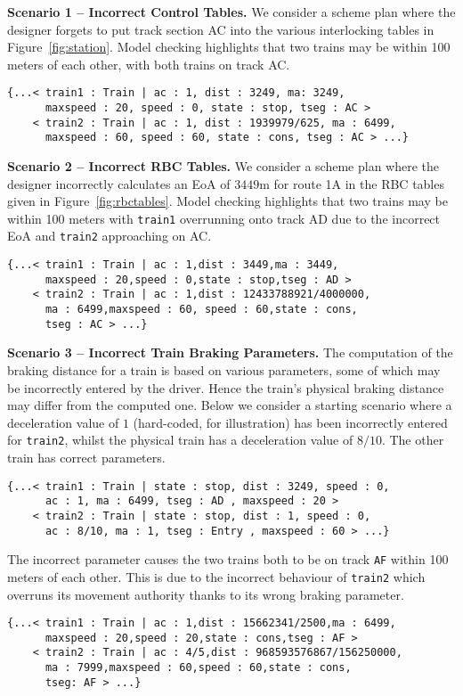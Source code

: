 \vspace{1ex}
\noindent
{\bf Scenario 1 -- Incorrect Control Tables.} We
consider a scheme plan where the designer forgets to put track section
AC into the various interlocking tables in
Figure~\ref{fig:station}. Model checking highlights that two trains
may be within 100 meters of each other, with both trains on track AC.

\begin{lstlisting}
{...< train1 : Train | ac : 1, dist : 3249, ma: 3249,
      maxspeed : 20, speed : 0, state : stop, tseg : AC >
    < train2 : Train | ac : 1, dist : 1939979/625, ma : 6499,
      maxspeed : 60, speed : 60, state : cons, tseg : AC > ...}
\end{lstlisting}

\vspace{1ex}
\noindent
{\bf Scenario 2 -- Incorrect RBC Tables.} We
consider a scheme plan where the designer incorrectly calculates an EoA
of $3449$m for route 1A in the RBC tables given in
Figure~\ref{fig:rbctables}. Model checking highlights that two trains
may be within 100 meters with \verb|train1| overrunning onto track AD due
to the incorrect EoA and \verb|train2| approaching on AC.

\begin{lstlisting}
{...< train1 : Train | ac : 1,dist : 3449,ma : 3449,
      maxspeed : 20,speed : 0,state : stop,tseg : AD >
    < train2 : Train | ac : 1,dist : 12433788921/4000000,
      ma : 6499,maxspeed : 60, speed : 60,state : cons,
      tseg : AC > ...}
\end{lstlisting}

\vspace{1ex}
\noindent
{\bf Scenario 3 -- Incorrect Train Braking Parameters.}
The computation of the braking distance for a train is
based on various parameters, some of which may be incorrectly entered
by the driver. Hence the train's physical braking distance may differ
from the computed one. Below we consider a starting scenario where a
deceleration value of $1$ (hard-coded, for illustration) has been
incorrectly entered for \verb|train2|, whilst the physical train has a
deceleration value of $8/10$. The other train has correct parameters.
\begin{lstlisting}
{...< train1 : Train | state : stop, dist : 3249, speed : 0,
      ac : 1, ma : 6499, tseg : AD , maxspeed : 20 >
    < train2 : Train | state : stop, dist : 1, speed : 0,
      ac : 8/10, ma : 1, tseg : Entry , maxspeed : 60 > ...}
\end{lstlisting}
The incorrect parameter causes the two trains both to be on track
\verb|AF| within 100 meters of each other. This is due
to the incorrect behaviour of \verb|train2| which overruns its movement
authority thanks to its wrong braking parameter.
\begin{lstlisting}
{...< train1 : Train | ac : 1,dist : 15662341/2500,ma : 6499,
      maxspeed : 20,speed : 20,state : cons,tseg : AF >
    < train2 : Train | ac : 4/5,dist : 968593576867/156250000,
      ma : 7999,maxspeed : 60,speed : 60,state : cons,
      tseg: AF > ...}
  
\end{lstlisting}
